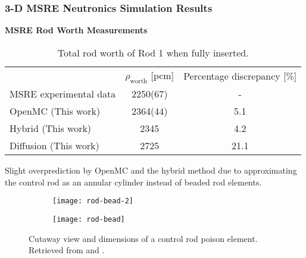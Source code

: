 \begin{frame}
  \frametitle{3-D MSRE Neutronics Simulation Results}
  \textbf{MSRE Rod Worth Measurements}
  \begin{table}[t]
    \centering
    \caption{Total rod worth of Rod 1 when fully inserted.}
    \small
    \begin{tabular}{l S[table-format=4(2)] S}
      \toprule
       & {$\rho_\text{worth}$ [pcm]} & {Percentage discrepancy [\%]}\\
       \cmidrule(rl){2-2} \cmidrule(l){3-3}
      \gls{MSRE} experimental data & 2250(67) & {-}\\
      OpenMC (This work) & 2364(44) & 5.1 \\
      Hybrid (This work) & 2345 & 4.2 \\
      Diffusion (This work) & 2725 & 21.1 \\
      \bottomrule
    \end{tabular}
    \label{table:rod-worth}
  \end{table}
  \vspace{.2cm}

  Slight overprediction by OpenMC and the hybrid method due to approximating the control rod
  as an annular cylinder instead of beaded rod elements.
  \begin{figure}[t]
    \begin{subfigure}[b]{0.22\columnwidth}
      \centering
      \texttt{[image: rod-bead-2]}
    \end{subfigure}
    \begin{subfigure}[b]{0.44\columnwidth}
      \centering
      \texttt{[image: rod-bead]}
    \end{subfigure}
    \caption{Cutaway view and dimensions of a control rod poison element. Retrieved from
    \cite{tolson_msre_1967} and \cite{robertson_msre_1965}.}
    \label{fig:rod-bead}
  \end{figure}
\end{frame}

